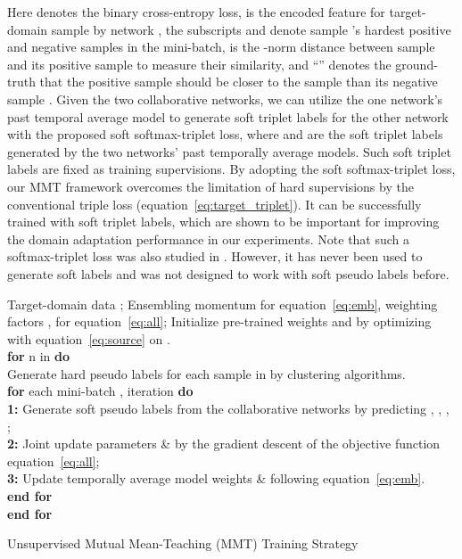 \documentclass{article} \usepackage{iclr2020_conference,times}
\def\eqref#1{equation~\ref{#1}}
\begin{document}
Here 
 denotes the binary cross-entropy loss, 
 is the encoded feature for target-domain sample  by network , the subscripts  and  denote sample 's hardest positive and negative samples in the mini-batch, 
 is the -norm distance between sample  and its positive sample  to measure their similarity, and ``'' denotes the ground-truth that 
the positive sample  should be closer to the sample  than its negative sample .
Given the two collaborative networks, we can utilize the one network's past temporal average model to generate soft triplet labels for the other network with the proposed soft softmax-triplet loss,
{\small
}where  and  are the soft triplet labels generated by the two networks' past temporally average models. Such soft triplet labels are fixed as training supervisions. By adopting the soft softmax-triplet loss, our MMT framework overcomes the limitation of hard supervisions by the conventional triple loss (\eqref{eq:target_triplet}). It can be successfully trained with soft triplet labels, which are shown to be important for improving the domain adaptation performance in our experiments.
Note that such a softmax-triplet loss was also studied in \citep{zhang2018large}. However, it has never been used to generate soft labels and was not designed to work with soft pseudo labels before.


\begin{algorithm}[t]
\scriptsize
\label{alg}
\begin{algorithmic}
\REQUIRE Target-domain data ;
\REQUIRE Ensembling momentum  for \eqref{eq:emb}, weighting factors ,  for \eqref{eq:all};
\REQUIRE Initialize pre-trained weights  and  by optimizing with \eqref{eq:source} on . \\
\textbf{for} n in  \textbf{do}\\
\quad Generate hard pseudo labels  for each sample  in  by clustering algorithms. \\
\quad \textbf{for} each mini-batch , iteration  \textbf{do}\\
\quad \quad \textbf{1:} Generate soft pseudo labels from the collaborative networks by predicting
, 
, 
,
; \\
\quad \quad \textbf{2:} Joint update parameters  \&  by the gradient descent of the objective function \eqref{eq:all}; \\
\quad \quad \textbf{3:} Update temporally average model weights  \&  following \eqref{eq:emb}. \\
\quad \textbf{end for}\\
\textbf{end for}
\end{algorithmic}
\caption{\small Unsupervised Mutual Mean-Teaching (MMT) Training Strategy} 
\end{algorithm}
\end{document}
